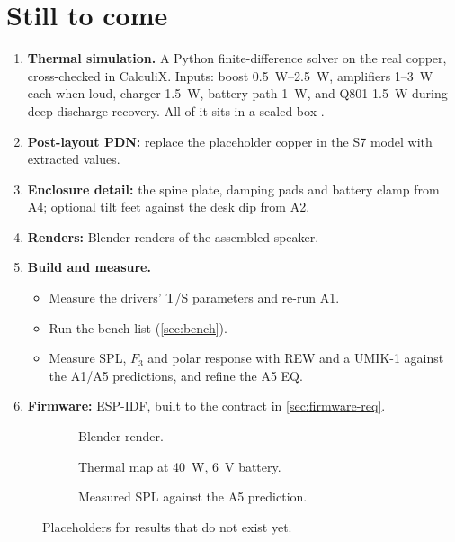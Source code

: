 \section{Still to come}\label{sec:pending}

\begin{enumerate}
  \item \textbf{Thermal simulation.} A Python finite-difference solver on the real copper, cross-checked in CalculiX. Inputs: boost \qtyrange{0.5}{2.5}{\watt}, amplifiers 1--\qty{3}{\watt} each when loud, charger \qty{1.5}{\watt}, battery path \qty{1}{\watt}, and Q801 \qty{1.5}{\watt} during deep-discharge recovery. All of it sits in a sealed box .
  \item \textbf{Post-layout PDN:} replace the placeholder copper in the S7 model with extracted values.
  \item \textbf{Enclosure detail:} the spine plate, damping pads and battery clamp from A4; optional tilt feet against the desk dip from A2.
  \item \textbf{Renders:} Blender renders of the assembled speaker.
  \item \textbf{Build and measure.}
  \begin{itemize}
    \item Measure the drivers' T/S parameters and re-run A1.
    \item Run the bench list (\cref{sec:bench}).
    \item Measure SPL, $F_3$ and polar response with REW and a UMIK-1 against the A1/A5 predictions, and refine the A5 EQ.
  \end{itemize}
  \item \textbf{Firmware:} ESP-IDF, built to the contract in \cref{sec:firmware-req}.
\end{enumerate}

\begin{figure}[htbp]
\centering
\begin{subfigure}[t]{0.32\linewidth}\centering\pendingbox[0.95\linewidth]{3.5cm}\caption{Blender render.}\end{subfigure}\hfill
\begin{subfigure}[t]{0.32\linewidth}\centering\pendingbox[0.95\linewidth]{3.5cm}\caption{Thermal map at \qty{40}{\watt}, \qty{6}{\volt} battery.}\end{subfigure}\hfill
\begin{subfigure}[t]{0.32\linewidth}\centering\pendingbox[0.95\linewidth]{3.5cm}\caption{Measured SPL against the A5 prediction.}\end{subfigure}
\caption{Placeholders for results that do not exist yet.}
\label{fig:pending}
\end{figure}
